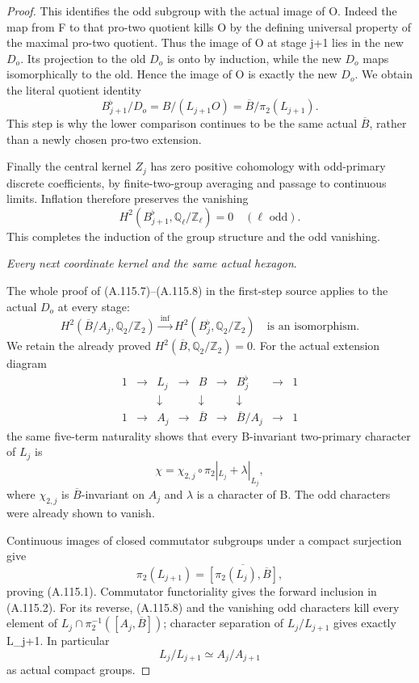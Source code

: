 \begin{proof}
This identifies the odd subgroup with the actual image of O. Indeed the map from F to that pro-two quotient kills O by the defining universal property of the maximal pro-two quotient. Thus the image of O at stage j+1 lies in the new \(D_o\). Its projection to the old \(D_o\) is onto by induction, while the new \(D_o\) maps isomorphically to the old. Hence the image of O is exactly the new \(D_o\). We obtain the literal quotient identity
\[
B_{j+1}^\flat/D_o
 =B/(L_{j+1}O)=\overline B/\pi_2(L_{j+1}).                   \tag{A.115.6}
\]
This step is why the lower comparison continues to be the same actual \(\overline B\), rather than a newly chosen pro-two extension.

Finally the central kernel \(Z_j\) has zero positive cohomology with odd-primary discrete coefficients, by finite-two-group averaging and passage to continuous limits. Inflation therefore preserves the vanishing
\[
H^2(B_{j+1}^\flat,\mathbb Q_\ell/\mathbb Z_\ell)=0
\quad(\ell\text{ odd}).
\]
This completes the induction of the group structure and the odd vanishing.

\medskip\noindent\emph{Every next coordinate kernel and the same actual hexagon}.

The whole proof of (A.115.7)--(A.115.8) in the first-step source applies to the actual \(D_o\) at every stage:
\[
H^2(\overline B/A_j,\mathbb Q_2/\mathbb Z_2)
 \xrightarrow{\ \mathrm{inf}\ }
H^2(B_j^\flat,\mathbb Q_2/\mathbb Z_2)
\quad\text{is an isomorphism}.                              \tag{A.115.7}
\]
We retain the already proved
\(H^2(\overline B,\mathbb Q_2/\mathbb Z_2)=0\).
For the actual extension diagram
\[
\begin{array}{ccccccccc}
1&\to&L_j&\to&B&\to&B_j^\flat&\to&1\\
 &&\downarrow&&\downarrow&&\downarrow\\
1&\to&A_j&\to&\overline B&\to&\overline B/A_j&\to&1
\end{array}
\]
the same five-term naturality shows that every B-invariant two-primary character of \(L_j\) is
\[
\chi=\chi_{2,j}\circ\pi_2|_{L_j}+\lambda|_{L_j},              \tag{A.115.8}
\]
where \(\chi_{2,j}\) is \(\overline B\)-invariant on \(A_j\) and \(\lambda\) is a character of B. The odd characters were already shown to vanish.

Continuous images of closed commutator subgroups under a compact surjection give
\[
\pi_2(L_{j+1})
 =\overline{[\pi_2(L_j),\overline B]},
\]
proving (A.115.1). Commutator functoriality gives the forward inclusion in (A.115.2). For its reverse, (A.115.8) and the vanishing odd characters kill every element of
\(L_j\cap\pi_2^{-1}([A_j,\overline B])\); character separation of \(L_j/L_{j+1}\) gives exactly L_{j+1}. In particular
\[
L_j/L_{j+1}\simeq A_j/A_{j+1}
\]
as actual compact groups.


\end{proof}
